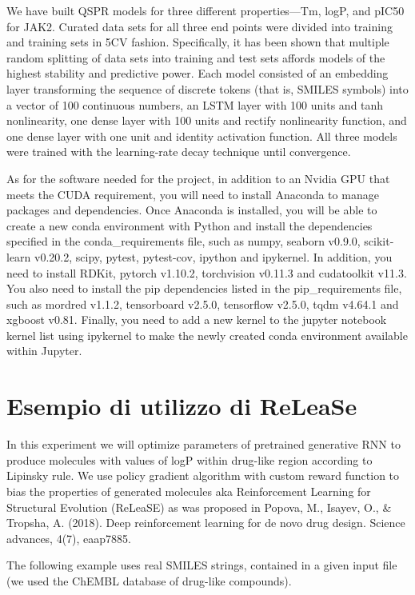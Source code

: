 \documentclass[conference]{IEEEtran}
\begin{document}
We have built QSPR models for three different properties—Tm, logP, and pIC50 for JAK2. Curated data sets for all three end points were divided into training and training sets in 5CV fashion. Specifically, it has been shown that multiple random splitting of data sets into training and test sets affords models of the highest stability and predictive power. Each model consisted of an embedding layer transforming the sequence of discrete tokens (that is, SMILES symbols) into a vector of 100 continuous numbers, an LSTM layer with 100 units and tanh nonlinearity, one dense layer with 100 units and rectify nonlinearity function, and one dense layer with one unit and identity activation function. All three models were trained with the learning-rate decay technique until convergence.

As for the software needed for the project, in addition to an Nvidia GPU that meets the CUDA requirement, you will need to install Anaconda to manage packages and dependencies. Once Anaconda is installed, you will be able to create a new conda environment with Python and install the dependencies specified in the conda_requirements file, such as numpy, seaborn v0.9.0, scikit-learn v0.20.2, scipy, pytest, pytest-cov, ipython and ipykernel. In addition, you need to install RDKit, pytorch v1.10.2, torchvision v0.11.3 and cudatoolkit v11.3. You also need to install the pip dependencies listed in the pip_requirements file, such as mordred v1.1.2, tensorboard v2.5.0, tensorflow v2.5.0, tqdm v4.64.1 and xgboost v0.81. Finally, you need to add a new kernel to the jupyter notebook kernel list using ipykernel to make the newly created conda environment available within Jupyter.

\section{Esempio di utilizzo di ReLeaSe}\label{sec:Esempio di utilizzo di ReLeaSe}

In this experiment we will optimize parameters of pretrained generative RNN to produce molecules with values of logP within drug-like region according to Lipinsky rule. We use policy gradient algorithm with custom reward function to bias the properties of generated molecules aka Reinforcement Learning for Structural Evolution (ReLeaSE) as was proposed in Popova, M., Isayev, O., & Tropsha, A. (2018). Deep reinforcement learning for de novo drug design. Science advances, 4(7), eaap7885.

The following example uses real SMILES strings, contained in a given input file (we used the ChEMBL database of drug-like compounds).
\end{document}
